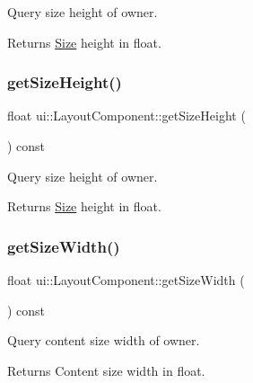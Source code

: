 Query size height of owner. \begin{DoxyReturn}{Returns}
\hyperlink{classSize}{Size} height in float. 
\end{DoxyReturn}
\mbox{\label{classui_1_1LayoutComponent_aa00a66a58b28af9b2c685f09a0923922}} 
\subsubsection{\texorpdfstring{get\+Size\+Height()}{getSizeHeight()}\hspace{0.1cm}{\footnotesize\ttfamily [2/2]}}
{\footnotesize\ttfamily float ui\+::\+Layout\+Component\+::get\+Size\+Height (\begin{DoxyParamCaption}{ }\end{DoxyParamCaption}) const}

Query size height of owner. \begin{DoxyReturn}{Returns}
\hyperlink{classSize}{Size} height in float. 
\end{DoxyReturn}
\mbox{\label{classui_1_1LayoutComponent_afc2fc62ee5436a6e1a825e94ee69bc64}} 
\subsubsection{\texorpdfstring{get\+Size\+Width()}{getSizeWidth()}\hspace{0.1cm}{\footnotesize\ttfamily [1/2]}}
{\footnotesize\ttfamily float ui\+::\+Layout\+Component\+::get\+Size\+Width (\begin{DoxyParamCaption}{ }\end{DoxyParamCaption}) const}

Query content size width of owner. \begin{DoxyReturn}{Returns}
Content size width in float. 
\end{DoxyReturn}
\mbox{\label{classui_1_1LayoutComponent_afc2fc62ee5436a6e1a825e94ee69bc64}} 

